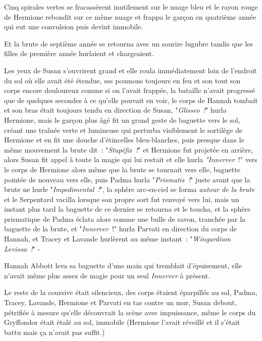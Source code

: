 Cinq spirales vertes se fracassèrent inutilement sur le nuage bleu et le rayon rouge de Hermione rebondit sur ce même nuage et frappa le garçon en quatrième année qui eut une convulsion puis devint immobile.

Et la brute de septième année se retourna avec un sourire lugubre tandis que les filles de première année hurlaient et chargeaient.

\later

Les yeux de Susan s'ouvrirent grand et elle roula immédiatement loin de l'endroit du sol où elle avait été étendue, ses poumons toujours en feu et son tout son corps encore douloureux comme si on l'avait frappée, la bataille n'avait progressé que de quelques secondes à ce qu'elle pouvait en voir, le corps de Hannah tombait et son bras était toujours tendu en direction de Susan, "\emph{Glisseo~!}" hurla Hermione, mais le garçon plus âgé fit un grand geste de baguette vers le sol, créant une traînée verte et lumineuse qui perturba visiblement le sortilège de Hermione et en fit une douche d'étincelles bleu-blanches, puis presque dans le même mouvement la brute dit~: "\emph{Stupéfix~!}" et Hermione fut projetée en arrière, alors Susan fit appel à toute la magie qui lui restait et elle hurla \emph{"Innerver}~!" vers le corps de Hermione alors même que la brute se tournait vers elle, baguette pointée de nouveau vers elle, puis Padma hurla "\emph{Prismatis~!}" juste avant que la brute ne hurle "\emph{Impedimental~!}", la sphère arc-en-ciel se forma \emph{autour de la brute} et le Serpentard vacilla lorsque son propre sort fut renvoyé vers lui, mais un instant plus tard la baguette de ce dernier se retourna et le toucha, et la sphère prismatique de Padma éclata alors comme une bulle de savon, tranchée par la baguette de la brute, et "\emph{Innerver}~!" hurla Parvati en direction du corps de Hannah, et Tracey et Lavande hurlèrent au même instant~: "\emph{Wingardium Leviosa~!}" -

\later

Hannah Abbott leva sa baguette d'une main qui tremblait d'épuisement, elle n'avait même plus assez de magie pour un seul \emph{Innerver} à présent.

Le reste de la coursive était silencieux, des corps étaient éparpillés au sol, Padma, Tracey, Lavande, Hermione et Parvati en tas contre un mur, Susan debout, pétrifiée à mesure qu'elle découvrait la scène avec impuissance, même le corps du Gryffondor était étalé au sol, immobile (Hermione l'avait réveillé et il s'était battu mais ça n'avait pas suffit.)

